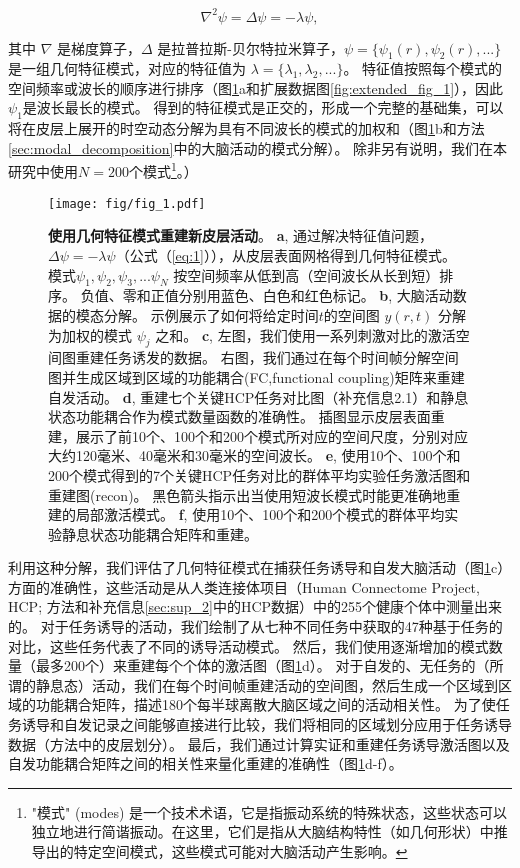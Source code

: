 \documentclass[lang=cn,a4paper,newtx]{elegantpaper}
\begin{document}
\begin{equation} \label{eq:1}
	\nabla^2 \psi = \Delta\psi = -\lambda \psi,
\end{equation}


其中 $ \nabla $ 是梯度算子，$ \Delta $ 是拉普拉斯-贝尔特拉米算子，$ \psi = \{\psi_1(r), \psi_2(r),...\} $ 是一组几何特征模式，对应的特征值为 $ \lambda = \{ \lambda_1, \lambda_2, ... \} $。
特征值按照每个模式的空间频率或波长的顺序进行排序（图\ref{fig:1}a和扩展数据图\ref{fig:extended_fig_1}），因此$ \psi_1 $是波长最长的模式。
得到的特征模式是正交的，形成一个完整的基础集，可以将在皮层上展开的时空动态分解为具有不同波长的模式的加权和（图\ref{fig:1}b和方法\ref{sec:modal_decomposition}中的大脑活动的模式分解）。
除非另有说明，我们在本研究中使用$ N = 200 $个模式\footnote{"模式" (modes) 是一个技术术语，它是指振动系统的特殊状态，这些状态可以独立地进行简谐振动。在这里，它们是指从大脑结构特性（如几何形状）中推导出的特定空间模式，这些模式可能对大脑活动产生影响。}。）


\begin{figure}[!htb]
	\centering
	\texttt{[image: fig/fig\_1.pdf]}
	\caption{\textbf{使用几何特征模式重建新皮层活动}。
	\textbf{a}, 通过解决特征值问题，$ \Delta \psi = -\lambda \psi $（公式（\ref{eq:1}）），从皮层表面网格得到几何特征模式。
	模式$ \psi_1, \psi_2, \psi_3, ... \psi_N $ 按空间频率从低到高（空间波长从长到短）排序。
	负值、零和正值分别用蓝色、白色和红色标记。
	\textbf{b}, 大脑活动数据的模态分解。
	示例展示了如何将给定时间$ t $的空间图 $ y(r,t) $ 分解为加权的模式 $ \psi_j $ 之和。
	\textbf{c}, 左图，我们使用一系列刺激对比的激活空间图重建任务诱发的数据。
	右图，我们通过在每个时间帧分解空间图并生成区域到区域的功能耦合(FC,functional coupling)矩阵来重建自发活动。
	\textbf{d}, 重建七个关键HCP任务对比图（补充信息2.1）和静息状态功能耦合作为模式数量函数的准确性。
	插图显示皮层表面重建，展示了前10个、100个和200个模式所对应的空间尺度，分别对应大约120毫米、40毫米和30毫米的空间波长。
	 \textbf{e}, 使用10个、100个和200个模式得到的7个关键HCP任务对比的群体平均实验任务激活图和重建图(recon)。
	 黑色箭头指示出当使用短波长模式时能更准确地重建的局部激活模式。 
	 \textbf{f}, 使用10个、100个和200个模式的群体平均实验静息状态功能耦合矩阵和重建。
	} \label{fig:1}
\end{figure}


利用这种分解，我们评估了几何特征模式在捕获任务诱导和自发大脑活动（图\ref{fig:1}c）方面的准确性，这些活动是从人类连接体项目（Human Connectome Project, HCP; 方法和补充信息\ref{sec:sup_2}中的HCP数据）中的255个健康个体中测量出来的。
对于任务诱导的活动，我们绘制了从七种不同任务中获取的47种基于任务的对比，这些任务代表了不同的诱导活动模式。
然后，我们使用逐渐增加的模式数量（最多200个）来重建每个个体的激活图（图\ref{fig:1}d）。
对于自发的、无任务的（所谓的静息态）活动，我们在每个时间帧重建活动的空间图，然后生成一个区域到区域的功能耦合矩阵，描述180个每半球离散大脑区域之间的活动相关性。
为了使任务诱导和自发记录之间能够直接进行比较，我们将相同的区域划分应用于任务诱导数据（方法中的皮层划分）。
最后，我们通过计算实证和重建任务诱导激活图以及自发功能耦合矩阵之间的相关性来量化重建的准确性（图\ref{fig:1}d-f）。
\end{document}
